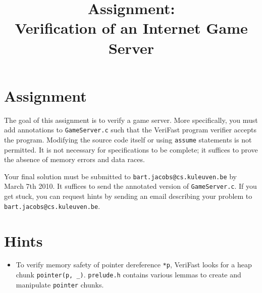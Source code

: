 \documentclass{article}
\title{Assignment:\\
Verification of an Internet Game Server}
\begin{document}
\maketitle

\section{Assignment}
The goal of this assignment is to verify a game server. More specifically, you must add annotations to \texttt{GameServer.c} such that the VeriFast program verifier accepts the program. Modifying the source code itself or using \texttt{assume} statements is not permitted. It is not necessary for specifications to be complete; it suffices to prove the absence of memory errors and data races.

Your final solution must be submitted to \texttt{bart.jacobs@cs.kuleuven.be} by March 7th 2010. It suffices to send the annotated version of \texttt{GameServer.c}. If you get stuck, you can request hints by sending an email describing your problem to \texttt{bart.jacobs@cs.kuleuven.be}.

\section{Hints}

\begin{itemize}
  \item To verify memory safety of pointer dereference \texttt{*p}, VeriFast looks for a heap chunk \texttt{pointer(p, \_)}. \texttt{prelude.h} contains various lemmas to create and manipulate \texttt{pointer} chunks.
\end{itemize}
\end{document}
